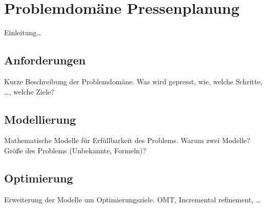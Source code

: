\chapter{Problemdomäne Pressenplanung}
\label{chapter:problem}
Einleitung\ldots

\section{Anforderungen}
Kurze Beschreibung der Problemdomäne.
Was wird gepresst, wie, welche Schritte, \ldots, welche Ziele?

\section{Modellierung}
\label{section:modellierung}
Mathematische Modelle für Erfüllbarkeit des Problems.
Warum zwei Modelle?
Größe des Problems (Unbekannte, Formeln)?

\section{Optimierung}
Erweiterung der Modelle um Optimierungsziele.
OMT, Incremental refinement, \ldots